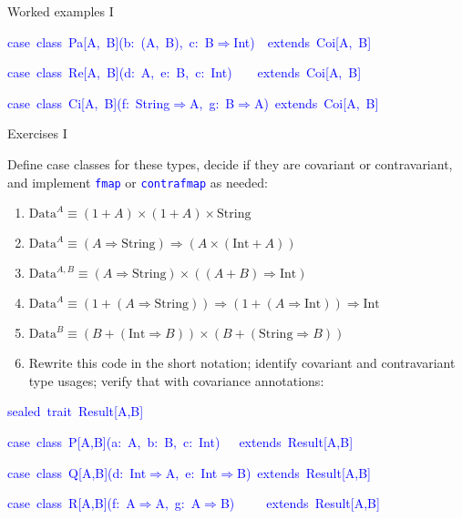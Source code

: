 \documentclass[english]{beamer}
\newenvironment{lyxcode}
   {\par\begin{list}{}{
     \setlength{\rightmargin}{\leftmargin}
     \setlength{\listparindent}{0pt}%
     \raggedright
     \setlength{\itemsep}{0pt}
     \setlength{\parsep}{0pt}
     \normalfont\ttfamily}%
    \def\{{\char`\{}
    \def\}{\char`\}}
    \def\textasciitilde{\char`\~}
    \item[]}
   {\end{list}}
\begin{document}
\begin{frame}{Worked examples I}
\begin{enumerate}
\begin{lyxcode}
\textcolor{blue}{\footnotesize{}case~class~Pa{[}A,~B{]}(b:~(A,~B),~c:~B$\Rightarrow$Int)~~extends~Coi{[}A,~B{]}}{\footnotesize \par}

\textcolor{blue}{\footnotesize{}case~class~Re{[}A,~B{]}(d:~A,~e:~B,~c:~Int)~~~~extends~Coi{[}A,~B{]}}{\footnotesize \par}

\textcolor{blue}{\footnotesize{}case~class~Ci{[}A,~B{]}(f:~String$\Rightarrow$A,~g:~B$\Rightarrow$A)~extends~Coi{[}A,~B{]}}{\footnotesize \par}
\end{lyxcode}
\end{enumerate}
\end{frame}

\begin{frame}{Exercises I}

Define case classes for these types, decide if they are covariant
or contravariant, and implement \texttt{\textcolor{blue}{\footnotesize{}fmap}}
or \texttt{\textcolor{blue}{\footnotesize{}contrafmap}} as needed:
\begin{enumerate}
\item $\text{Data}^{A}\equiv\left(1+A\right)\times\left(1+A\right)\times\text{String}$
\item $\text{Data}^{A}\equiv\left(A\Rightarrow\text{String}\right)\Rightarrow\left(A\times\left(\text{Int}+A\right)\right)$
\item $\text{Data}^{A,B}\equiv\left(A\Rightarrow\text{String}\right)\times\left(\left(A+B\right)\Rightarrow\text{Int}\right)$
\item $\text{Data}^{A}\equiv\left(1+\left(A\Rightarrow\text{String}\right)\right)\Rightarrow\left(1+\left(A\Rightarrow\text{Int}\right)\right)\Rightarrow\text{Int}$
\item $\text{Data}^{B}\equiv\left(B+\left(\text{Int}\Rightarrow B\right)\right)\times\left(B+\left(\text{String}\Rightarrow B\right)\right)$
\item Rewrite this code in the short notation; identify covariant and contravariant
type usages; verify that with covariance annotations:
\end{enumerate}
\begin{lyxcode}
\textcolor{blue}{\footnotesize{}sealed~trait~Result{[}A,B{]}}{\footnotesize \par}

\textcolor{blue}{\footnotesize{}case~class~P{[}A,B{]}(a:~A,~b:~B,~c:~Int)~~~extends~Result{[}A,B{]}}{\footnotesize \par}

\textcolor{blue}{\footnotesize{}case~class~Q{[}A,B{]}(d:~Int$\Rightarrow$A,~e:~Int$\Rightarrow$B)~extends~Result{[}A,B{]}}{\footnotesize \par}

\textcolor{blue}{\footnotesize{}case~class~R{[}A,B{]}(f:~A$\Rightarrow$A,~g:~A$\Rightarrow$B)~~~~~extends~Result{[}A,B{]}}{\footnotesize \par}
\end{lyxcode}
\end{frame}
\end{document}
